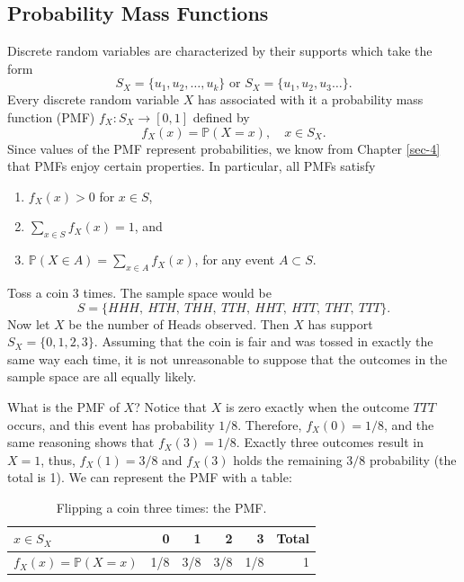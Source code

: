 \documentclass[captions=tableheading]{scrbook}
\begin{document}
\subsection{Probability Mass Functions}
\label{sec-5-1-1}
\label{sub-probability-mass-functions}


Discrete random variables are characterized by their supports which take the form
\begin{equation}
S_{X}=\{u_{1},u_{2},\ldots,u_{k}\}\mbox{ or }S_{X}=\{u_{1},u_{2},u_{3}\ldots\}.
\end{equation}
Every discrete random variable \(X\) has associated with it a probability mass function (PMF) \(f_{X}:S_{X}\to[0,1]\) defined by
\begin{equation}
f_{X}(x)=\mathbb{P}(X=x),\quad x\in S_{X}.
\end{equation}
Since values of the PMF represent probabilities, we know from Chapter \ref{sec-4} that PMFs enjoy certain properties. In particular, all PMFs satisfy
\begin{enumerate}
\item \(f_{X}(x)>0\) for \(x\in S\),
\item \(\sum_{x\in S}f_{X}(x)=1\), and
\item \(\mathbb{P}(X\in A)=\sum_{x\in A}f_{X}(x)\), for any event \(A\subset S\).
\end{enumerate}

\begin{example}

Toss a coin 3 times. The sample space would be
\[
S=\{ HHH,\ HTH,\ THH,\ TTH,\ HHT,\ HTT,\ THT,\ TTT\}.
\]
Now let \(X\) be the number of Heads observed. Then \(X\) has support \(S_{X}=\{ 0,1,2,3\} \). Assuming that the coin is fair and was tossed in exactly the same way each time, it is not unreasonable to suppose that the outcomes in the sample space are all equally likely. 

What is the PMF of \(X\)? Notice that \(X\) is zero exactly when the outcome \(TTT\) occurs, and this event has probability \(1/8\). Therefore, \(f_{X}(0)=1/8\), and the same reasoning shows that \(f_{X}(3)=1/8\). Exactly three outcomes result in \(X=1\), thus, \(f_{X}(1)=3/8\) and \(f_{X}(3)\) holds the remaining \(3/8\) probability (the total is 1). We can represent the PMF with a table:

\begin{table}[htb]
\caption[Flipping a coin thrice: the PMF]{Flipping a coin three times: the PMF.} \label{tab-pmf-flip-coin-three}
\begin{center}
\begin{tabular}{lrrrrr}
 \(x\in S_{X}\)                &    0  &    1  &    2  &    3  &  Total  \\
\hline
 \(f_{X}(x)=\mathbb{P}(X=x)\)  &  1/8  &  3/8  &  3/8  &  1/8  &      1  \\
\end{tabular}
\end{center}
\end{table}


\end{example}
\end{document}
